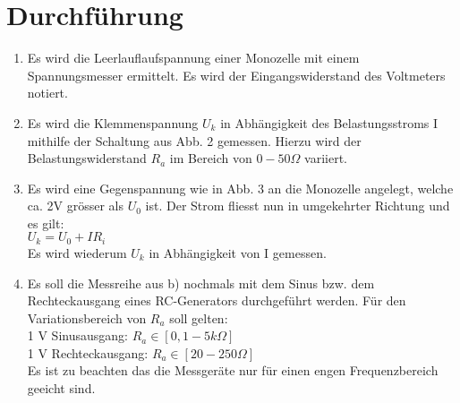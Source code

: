 \section{Durchführung}
\label{sec:Durchführung}

\renewcommand{\labelenumi}{\alph{enumi})}
\begin{enumerate}
    \item Es wird die Leerlauflaufspannung einer Monozelle mit einem Spannungsmesser ermittelt.
    Es wird der Eingangswiderstand des Voltmeters notiert.

    \item Es wird die Klemmenspannung $U_k$ in Abhängigkeit des Belastungsstroms I mithilfe
    der Schaltung aus Abb. 2 gemessen.
    Hierzu wird der Belastungswiderstand $R_a$ im Bereich von $ 0-50 \Omega$ variiert.

    \item Es wird eine Gegenspannung wie in Abb. 3 an die Monozelle angelegt, welche ca. 2V
    grösser als $U_0$ ist. Der Strom fliesst nun in umgekehrter Richtung und es gilt:\\
    $U_k = U_0 + IR_i$\\
    Es wird wiederum $U_k$ in Abhängigkeit von I gemessen.

    \item Es soll die Messreihe aus b) nochmals mit dem Sinus bzw. dem
    Rechteckausgang eines RC-Generators durchgeführt werden. Für den Variationsbereich
    von $R_a$ soll gelten:\\
    1 V Sinusausgang: $R_a \in [0,1 - 5 k\Omega]$\\
    1 V Rechteckausgang: $R_a \in [20 -250 \Omega]$\\
    Es ist zu beachten das die Messgeräte nur für einen engen Frequenzbereich geeicht sind.
\end{enumerate}
